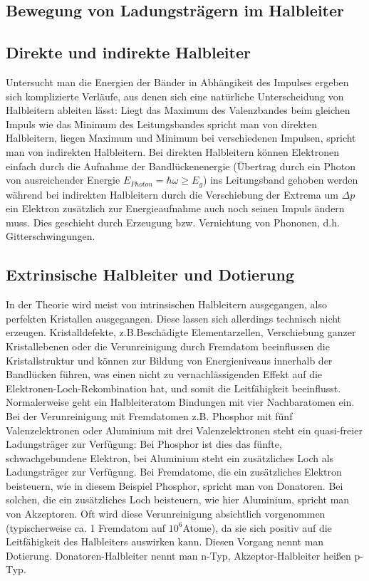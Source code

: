 \documentclass[12pt]{article}
\begin{document}
\subsection{Bewegung von Ladungsträgern im Halbleiter}

\subsection{Direkte und indirekte Halbleiter}

Untersucht man die Energien der Bänder in Abhängikeit des Impulses ergeben sich komplizierte Verläufe, aus denen sich eine natürliche Unterscheidung von Halbleitern ableiten lässt: Liegt das Maximum des Valenzbandes beim gleichen Impuls wie das Minimum des Leitungsbandes spricht man von direkten Halbleitern, liegen Maximum und Minimum bei verschiedenen Impulsen, spricht man von indirekten Halbleitern.
Bei direkten Halbleitern können Elektronen einfach durch die Aufnahme der Bandlückenenergie (Übertrag durch ein Photon von ausreichender Energie $E_{Photon}=\hbar\omega\geq E_g$) ins Leitungsband gehoben werden während bei indirekten Halbleitern durch die Verschiebung der Extrema um $\Delta p$ ein Elektron zusätzlich zur Energieaufnahme auch noch seinen Impuls ändern muss. Dies geschieht durch Erzeugung bzw. Vernichtung von Phononen, d.h. Gitterschwingungen.

\subsection{Extrinsische Halbleiter und Dotierung}

In der Theorie wird meist von intrinsischen Halbleitern ausgegangen, also perfekten Kristallen ausgegangen.  Diese lassen sich allerdings technisch nicht erzeugen. Kristalldefekte, z.B.Beschädigte Elementarzellen, Verschiebung ganzer Kristallebenen oder die Verunreinigung durch Fremdatom beeinflussen die Kristallstruktur und können zur Bildung von Energieniveaus innerhalb der Bandlücken führen, was einen nicht zu vernachlässigenden Effekt auf die Elektronen-Loch-Rekombination hat, und somit die Leitfähigkeit beeinflusst.\\
Normalerweise geht ein Halbleiteratom Bindungen mit vier Nachbaratomen ein. Bei der Verunreinigung mit Fremdatomen z.B. Phosphor mit fünf Valenzelektronen oder Aluminium mit drei Valenzelektronen steht ein quasi-freier Ladungsträger zur Verfügung: Bei Phosphor ist dies das fünfte, schwachgebundene Elektron, bei Aluminium steht ein zusätzliches Loch als Ladungsträger zur Verfügung. Bei Fremdatome, die ein zusätzliches Elektron beisteuern, wie in diesem Beispiel Phosphor, spricht man von Donatoren. Bei solchen, die ein zusätzliches Loch beisteuern, wie hier Aluminium, spricht man von Akzeptoren.
Oft wird diese Verunreinigung absichtlich vorgenommen (typischerweise ca. 1 Fremdatom auf $10^6$Atome), da sie sich positiv auf die Leitfähigkeit des Halbleiters auswirken kann. Diesen Vorgang nennt man Dotierung. Donatoren-Halbleiter nennt man n-Typ, Akzeptor-Halbleiter heißen p-Typ.
\end{document}
